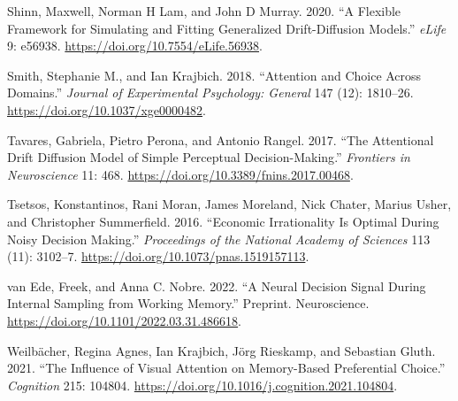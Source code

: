 \documentclass[
]{book}
\newlength{\cslhangindent}
\newlength{\cslentryspacingunit} %
\newenvironment{CSLReferences}[2] %
 {%
  \setlength{\parindent}{0pt}
  \ifodd #1
  \let\oldpar\par
  \def\par{\hangindent=\cslhangindent\oldpar}
  \fi
  \setlength{\parskip}{#2\cslentryspacingunit}
 }%
 {}
\begin{document}
\begin{CSLReferences}{1}{0}
\leavevmode{}%
Shinn, Maxwell, Norman H Lam, and John D Murray. 2020. {``A Flexible Framework for Simulating and Fitting Generalized Drift-Diffusion Models.''} \emph{eLife} 9: e56938. \url{https://doi.org/10.7554/eLife.56938}.

\leavevmode{}%
Smith, Stephanie M., and Ian Krajbich. 2018. {``Attention and Choice Across Domains.''} \emph{Journal of Experimental Psychology: General} 147 (12): 1810--26. \url{https://doi.org/10.1037/xge0000482}.

\leavevmode{}%
Tavares, Gabriela, Pietro Perona, and Antonio Rangel. 2017. {``The {Attentional Drift Diffusion Model} of {Simple Perceptual Decision-Making}.''} \emph{Frontiers in Neuroscience} 11: 468. \url{https://doi.org/10.3389/fnins.2017.00468}.

\leavevmode{}%
Tsetsos, Konstantinos, Rani Moran, James Moreland, Nick Chater, Marius Usher, and Christopher Summerfield. 2016. {``Economic Irrationality Is Optimal During Noisy Decision Making.''} \emph{Proceedings of the National Academy of Sciences} 113 (11): 3102--7. \url{https://doi.org/10.1073/pnas.1519157113}.

\leavevmode{}%
van Ede, Freek, and Anna C. Nobre. 2022. {``A Neural Decision Signal During Internal Sampling from Working Memory.''} Preprint. {Neuroscience}. \url{https://doi.org/10.1101/2022.03.31.486618}.

\leavevmode{}%
Weilbächer, Regina Agnes, Ian Krajbich, Jörg Rieskamp, and Sebastian Gluth. 2021. {``The Influence of Visual Attention on Memory-Based Preferential Choice.''} \emph{Cognition} 215: 104804. \url{https://doi.org/10.1016/j.cognition.2021.104804}.

\end{CSLReferences}
\end{document}
